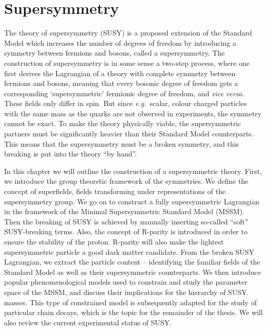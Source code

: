 \chapter{Supersymmetry}%
\label{ch:susyintro}
The theory of supersymmetry (SUSY) is a proposed extension of the Standard Model which increases the number of degrees of freedom by introducing a symmetry between fermions and bosons, called a supersymmetry. The construction of supersymmetry is in some sense a two-step process, where one first derives the Lagrangian of a theory with complete symmetry between fermions and bosons, meaning that every bosonic degree of freedom gets a corresponding `supersymmetric' fermionic degree of freedom, and {\it vice versa}. These fields only differ in spin. But since {\it e.g.}\ scalar, colour charged particles with the same mass as the quarks are not observed in experiments, the symmetry cannot be exact. To make the theory physically viable, the supersymmetric partners must be significantly heavier than their Standard Model counterparts. This means that the supersymmetry must be a broken symmetry, and this breaking is put into the theory ``by hand''.

In this chapter we will outline the construction of a supersymmetric theory. First, we introduce the group theoretic framework of the symmetries. We define the concept of superfields, fields transforming under representations of the supersymmetry group. We go on to construct a fully supersymmetric Lagrangian in the framework of the Minimal Supersymmetric Standard Model (MSSM). Then the breaking of SUSY is achieved by manually inserting so-called ``soft'' SUSY-breaking terms. Also, the concept of R-parity is introduced in order to ensure the stability of the proton. R-parity will also make the lightest supersymmetric particle a good dark matter candidate. From the broken SUSY Lagrangian, we extract the particle content -- identifying the familiar fields of the Standard Model as well as their supersymmetric counterparts. We then introduce popular phenomenological models used to constrain and study the parameter space of the MSSM, and discuss their implications for the hierarchy of SUSY masses. This type of constrained model is subsequently adapted for the study of particular chain decays, which is the topic for the remainder of the thesis. We will also review the current experimental status of SUSY. 

